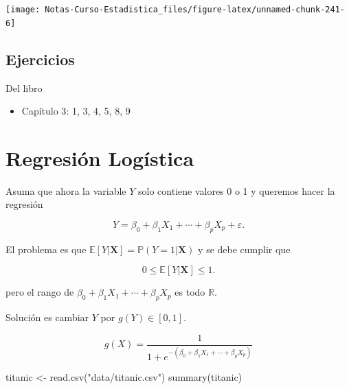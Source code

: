 \documentclass[
  12pt,
]{book}
\newenvironment{Shaded}{\begin{snugshade}}{\end{snugshade}}
\newcommand{\FunctionTok}[1]{\textcolor[rgb]{0.00,0.00,0.00}{#1}}
\newcommand{\NormalTok}[1]{#1}
\newcommand{\OtherTok}[1]{\textcolor[rgb]{0.56,0.35,0.01}{#1}}
\newcommand{\StringTok}[1]{\textcolor[rgb]{0.31,0.60,0.02}{#1}}
\providecommand{\tightlist}{%
  \setlength{\itemsep}{0pt}\setlength{\parskip}{0pt}}
\theoremstyle{definition}
\theoremstyle{definition}
\theoremstyle{definition}
\theoremstyle{remark}
\begin{document}
\begin{center}\texttt{[image: Notas-Curso-Estadistica\_files/figure-latex/unnamed-chunk-241-6]} \end{center}

\hypertarget{ejercicios-3}{%
\section{Ejercicios}\label{ejercicios-3}}

Del libro \autocite{James2013b}

\begin{itemize}
\tightlist
\item
  Capítulo 3: 1, 3, 4, 5, 8, 9
\end{itemize}

\hypertarget{regresiuxf3n-loguxedstica}{%
\chapter{Regresión Logística}\label{regresiuxf3n-loguxedstica}}

Asuma que ahora la variable \(Y\) solo contiene valores 0 o 1 y queremos hacer la regresión

\begin{equation*}
Y = \beta_{0} +\beta_{1} X_{1} + \cdots + \beta_{p} X_{p} + \varepsilon.
\end{equation*}

El problema es que \(\mathbb{E}\left[Y | \boldsymbol{X}\right] = \mathbb{P}\left(Y=1\vert \boldsymbol{X}\right)\) y se debe cumplir que

\begin{equation*}
0\leq \mathbb{E}\left[Y | \boldsymbol{X}\right]\leq 1.
\end{equation*}

pero el rango de \(\beta_{0} +\beta_{1} X_{1} + \cdots + \beta_{p} X_{p}\) es todo \(\mathbb{R}\).

Solución es cambiar \(Y\) por \(g(Y)\in [0,1]\).

\begin{equation*}
g(X) = \frac{1}{1+e^{-(\beta_{0} +\beta_{1} X_{1} + \cdots + \beta_{p} X_{p})}}
\end{equation*}

\begin{Shaded}
\begin{Highlighting}[]
\NormalTok{titanic }\OtherTok{\textless{}{-}} \FunctionTok{read.csv}\NormalTok{(}\StringTok{"data/titanic.csv"}\NormalTok{)}
\FunctionTok{summary}\NormalTok{(titanic)}
\end{Highlighting}
\end{Shaded}
\end{document}
